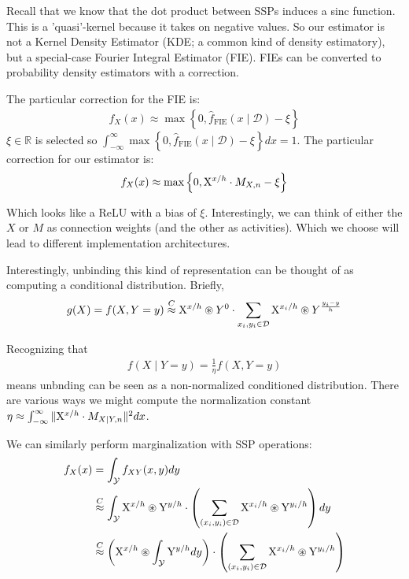 \documentclass[10pt,letterpaper,oneside]{article}
\newcommand{\bind}{\circledast}
\newcommand{\analog}{\overset{C}{\approx}}
\newcommand{\domain}[1]{\mathcal{#1}}
\newcommand{\ssp}[1]{\mathrm{\uppercase{#1}}^{\lowercase{#1}/h}}
\newcommand{\sspi}[2]{\mathrm{\uppercase{#1}}^{\lowercase{#1}_{#2}/h}}
\begin{document}
Recall that we know that the dot product between SSPs induces a sinc function.  This is a 'quasi'-kernel because it takes on negative values. So our estimator is not a Kernel Density Estimator (KDE; a common kind of density estimatory), but a special-case Fourier Integral Estimator (FIE). FIEs can be converted to probability density estimators with a correction.

The particular correction for the FIE is:
\begin{align}
  f_{X}(x) \approx \max\left\{0,\hat{f}_\mathrm{FIE}\left(x \mid \mathcal{D}\right)-\xi\right\}
\end{align}
$\xi\in \mathbb{R}$ is selected so $\int_{-\infty}^{\infty}\max\left\{0,\hat{f}_\mathrm{FIE}\left(x \mid \mathcal{D}\right)-\xi\right\}dx = 1$. The particular correction for our estimator is: 
\begin{align}
  f_{X}(x) \approx \max\left\{0,\ssp{x}\cdot M_{X,n} - \xi\right\}
\end{align}

Which looks like a ReLU with a bias of $\xi$. Interestingly, we can think of either the $X$ or $M$ as connection weights (and the other as activities). Which we choose will lead to different implementation architectures.

Interestingly, unbinding this kind of representation can be thought of as computing a conditional distribution.  Briefly, 
\begin{align}
  g(X) = f(X,Y=y) \analog \ssp{x}\bind Y^{0}\cdot \sum_{x_i,y_i \in \mathcal{D}} \sspi{x}{i}\bind Y^{\frac{y_{i}-y}{h}}
\end{align}

Recognizing that 
\begin{align}
  f(X\mid Y=y) = \frac{1}{\eta}f(X,Y=y)
\end{align}
means unbnding can be seen as a non-normalized conditioned distribution. There are various ways we might compute the normalization constant $\eta \approx \int_{-\infty}^{\infty}\|\ssp{X}\cdot M_{X\mid Y,n}\|^{2} dx$.

We can similarly perform marginalization with SSP operations:
\begin{align}
  f_{X}(x) &= \int_{\domain{Y}}f_{XY}(x,y)dy \\
  &\analog \int_{\domain{Y}}\ssp{X}\bind\ssp{Y} \cdot \left(\sum_{(x_{i},y_{i}) \in \mathcal{D}}\sspi{X}{i}\bind\sspi{Y}{i}\right)dy \\
  &\analog \left(\ssp{X}\bind\int_{\domain{Y}}\ssp{Y}dy\right) \cdot \left(\sum_{(x_{i},y_{i}) \in \mathcal{D}}\sspi{X}{i}\bind\sspi{Y}{i}\right)
\end{align}
\end{document}
